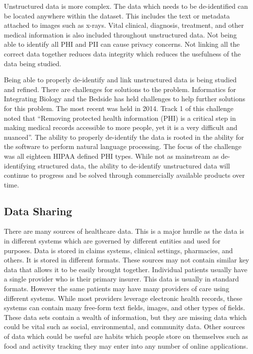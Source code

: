 \documentclass[sigconf]{acmart}
\begin{document}
Unstructured data is more complex.  The data which needs to be 
de-identified can be located anywhere within the dataset.  This includes 
the text or metadata attached to images such as x-rays.  Vital clinical, 
diagnosis, treatment, and other medical information is also included 
throughout unstructured data.  Not being able to identify all PHI and 
PII can cause privacy concerns.  Not linking all the correct data 
together reduces data integrity which reduces the usefulness of the 
data being studied.  

Being able to properly de-identify and link unstructured data is 
being studied and refined.  There are challenges for solutions to the 
problem.  Informatics for Integrating Biology and the Bedside\cite{i2b2} 
has held challenges to help further solutions for this problem.  The 
most recent was held in 2014.   Track 1 of this challenge noted that 
``Removing protected health information (PHI) is a critical step in 
making medical records accessible to more people, yet it is a very 
difficult and nuanced''\cite{i2b2}.  The ability to properly de-identify 
the data is rooted in the ability for the software to perform natural 
language processing.  The focus of the challenge was all eighteen HIPAA 
defined PHI types\cite{ScienceDirect}.  While not as mainstream as 
de-identifying structured data, the ability to de-identify unstructured 
data will continue to progress and be solved through commercially 
available products over time.

\subsection{Data Sharing}
There are many sources of healthcare data.  This is a major hurdle as the 
data is in different systems which are governed by different entities and 
used for purposes\cite{Datapine}.  Data is stored in claims systems, 
clinical settings, pharmacies, and others.  It is stored in different 
formats.  These sources may not contain similar key data that allows it 
to be easily brought together.  Individual patients usually have a single 
provider who is their primary insurer.  This data is usually in standard 
formats.  However the same patients may have many providers of care using 
different systems.  While most providers leverage electronic health 
records, these systems can contain many free-form text fields, images, and 
other types of fields. These data sets contain a wealth of information, 
but they are missing data which could be vital such as social, 
environmental, and community data.  Other sources of data which could be 
useful are habits which people store on themselves such as food and 
activity tracking they may enter into any number of online 
applications\cite{HCAPop}.
\end{document}
